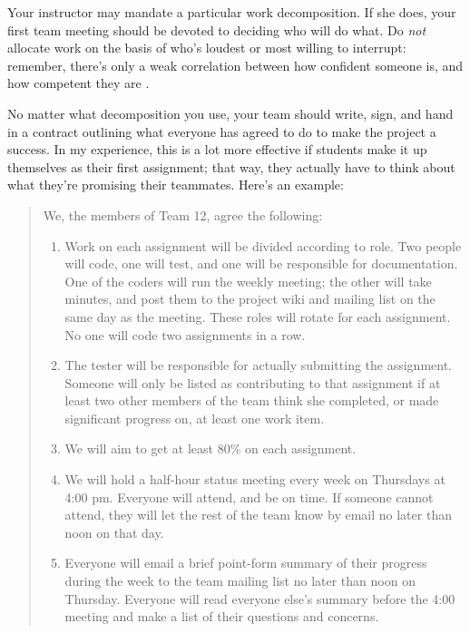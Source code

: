 \documentclass{report}
\begin{document}
Your instructor may mandate a particular work decomposition.  If she
does, your first team meeting should be devoted to deciding who will
do what.  Do \emph{not} allocate work on the basis of who's loudest or
most willing to interrupt: remember, there's only a weak correlation
between how confident someone is, and how competent they are
\cite{b:kruger-dunning-competence}.

No matter what decomposition you use, your team should write, sign,
and hand in a contract outlining what everyone has agreed to do to
make the project a success.  In my experience, this is a lot more
effective if students make it up themselves as their first assignment;
that way, they actually have to think about what they're promising
their teammates.  Here's an example:

\begin{quotation}

  We, the members of Team 12, agree the following:

  \begin{enumerate}

    \item Work on each assignment will be divided according to role.
    Two people will code, one will test, and one will be responsible
    for documentation.  One of the coders will run the weekly meeting;
    the other will take minutes, and post them to the project wiki and
    mailing list on the same day as the meeting.  These roles will
    rotate for each assignment.  No one will code two assignments in a
    row.

    \item The tester will be responsible for actually submitting the
    assignment.  Someone will only be listed as contributing to that
    assignment if at least two other members of the team think she
    completed, or made significant progress on, at least one work
    item.

    \item We will aim to get at least 80\% on each assignment.

    \item We will hold a half-hour status meeting every week on
    Thursdays at 4:00 pm.  Everyone will attend, and be on time.  If
    someone cannot attend, they will let the rest of the team know by
    email no later than noon on that day.

    \item Everyone will email a brief point-form summary of their
    progress during the week to the team mailing list no later than
    noon on Thursday.  Everyone will read everyone else's summary
    before the 4:00 meeting and make a list of their questions and
    concerns.


\end{enumerate}
\end{quotation}
\end{document}
